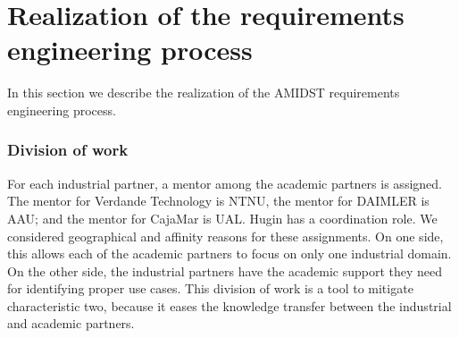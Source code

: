 
\section{Realization of the requirements engineering process}
\label{sec:realization}

In this section we describe the realization of the AMIDST requirements engineering process.









\subsubsection*{Division of work}

For each industrial partner, a mentor among the academic partners is assigned. The mentor for Verdande Technology is NTNU, the mentor for DAIMLER is AAU; and the mentor for CajaMar is UAL. Hugin has a coordination role. We considered geographical and affinity reasons for these assignments.  On one side, this allows each of the academic partners to focus on only one industrial domain.  On the other side, the industrial partners have the academic support they need for identifying proper use cases.  This division of work is a tool to mitigate characteristic two, because it eases the knowledge transfer between the industrial and academic partners. 


